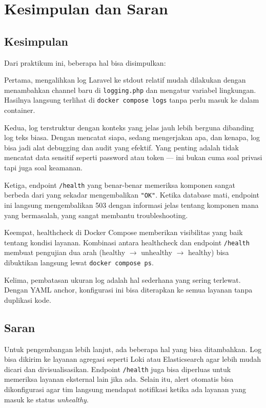 \documentclass[a4paper,oneside,11pt]{book}
\begin{document}
\chapter{Kesimpulan dan Saran}

\section{Kesimpulan}

Dari praktikum ini, beberapa hal bisa disimpulkan:

Pertama, mengalihkan log Laravel ke stdout relatif mudah dilakukan dengan menambahkan channel
baru di \texttt{logging.php} dan mengatur variabel lingkungan. Hasilnya langsung terlihat di
\texttt{docker compose logs} tanpa perlu masuk ke dalam container.

Kedua, log terstruktur dengan konteks yang jelas jauh lebih berguna dibanding log teks biasa.
Dengan mencatat siapa, sedang mengerjakan apa, dan kenapa, log bisa jadi alat debugging dan
audit yang efektif. Yang penting adalah tidak mencatat data sensitif seperti password atau
token --- ini bukan cuma soal privasi tapi juga soal keamanan.

Ketiga, endpoint \texttt{/health} yang benar-benar memeriksa komponen sangat berbeda dari
yang sekadar mengembalikan \texttt{"OK"}. Ketika database mati, endpoint ini langsung
mengembalikan 503 dengan informasi jelas tentang komponen mana yang bermasalah, yang sangat
membantu troubleshooting.

Keempat, healthcheck di Docker Compose memberikan visibilitas yang baik tentang kondisi
layanan. Kombinasi antara healthcheck dan endpoint \texttt{/health} membuat pengujian
dua arah (healthy $\rightarrow$ unhealthy $\rightarrow$ healthy) bisa dibuktikan langsung
lewat \texttt{docker compose ps}.

Kelima, pembatasan ukuran log adalah hal sederhana yang sering terlewat. Dengan YAML anchor,
konfigurasi ini bisa diterapkan ke semua layanan tanpa duplikasi kode.

\section{Saran}

Untuk pengembangan lebih lanjut, ada beberapa hal yang bisa ditambahkan. Log bisa dikirim
ke layanan agregasi seperti Loki atau Elasticsearch agar lebih mudah dicari dan divisualisasikan.
Endpoint \texttt{/health} juga bisa diperluas untuk memeriksa layanan eksternal lain jika
ada. Selain itu, alert otomatis bisa dikonfigurasi agar tim langsung mendapat notifikasi ketika
ada layanan yang masuk ke status \textit{unhealthy}.
\end{document}
